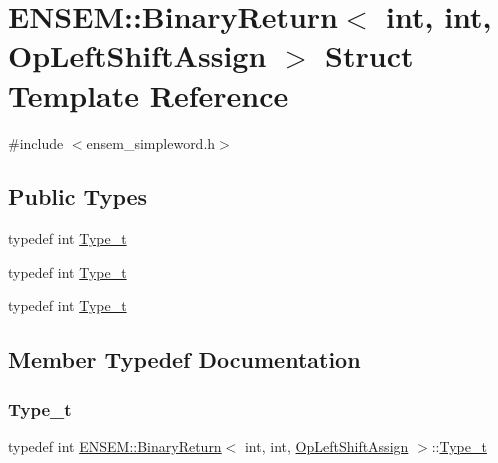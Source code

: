 \hypertarget{structENSEM_1_1BinaryReturn_3_01int_00_01int_00_01OpLeftShiftAssign_01_4}{}\section{E\+N\+S\+EM\+:\+:Binary\+Return$<$ int, int, Op\+Left\+Shift\+Assign $>$ Struct Template Reference}
\label{structENSEM_1_1BinaryReturn_3_01int_00_01int_00_01OpLeftShiftAssign_01_4}


{\ttfamily \#include $<$ensem\+\_\+simpleword.\+h$>$}

\subsection*{Public Types}
\begin{DoxyCompactItemize}
\item 
typedef int \mbox{\hyperlink{structENSEM_1_1BinaryReturn_3_01int_00_01int_00_01OpLeftShiftAssign_01_4_abe15562b5780c9ed9e3357639d2843ba}{Type\+\_\+t}}
\item 
typedef int \mbox{\hyperlink{structENSEM_1_1BinaryReturn_3_01int_00_01int_00_01OpLeftShiftAssign_01_4_abe15562b5780c9ed9e3357639d2843ba}{Type\+\_\+t}}
\item 
typedef int \mbox{\hyperlink{structENSEM_1_1BinaryReturn_3_01int_00_01int_00_01OpLeftShiftAssign_01_4_abe15562b5780c9ed9e3357639d2843ba}{Type\+\_\+t}}
\end{DoxyCompactItemize}


\subsection{Member Typedef Documentation}
\mbox{\label{structENSEM_1_1BinaryReturn_3_01int_00_01int_00_01OpLeftShiftAssign_01_4_abe15562b5780c9ed9e3357639d2843ba}} 
\subsubsection{\texorpdfstring{Type\_t}{Type\_t}\hspace{0.1cm}{\footnotesize\ttfamily [1/3]}}
{\footnotesize\ttfamily typedef int \mbox{\hyperlink{structENSEM_1_1BinaryReturn}{E\+N\+S\+E\+M\+::\+Binary\+Return}}$<$ int, int, \mbox{\hyperlink{structENSEM_1_1OpLeftShiftAssign}{Op\+Left\+Shift\+Assign}} $>$\+::\mbox{\hyperlink{structENSEM_1_1BinaryReturn_3_01int_00_01int_00_01OpLeftShiftAssign_01_4_abe15562b5780c9ed9e3357639d2843ba}{Type\+\_\+t}}}

